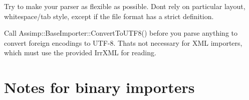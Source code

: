 \begin{DoxyItemize}
\item Try to make your parser as flexible as possible. Don\textquotesingle{}t rely on particular layout, whitespace/tab style, except if the file format has a strict definition. 
\item Call Assimp\+::\+Base\+Importer\+::\+Convert\+To\+U\+T\+F8() before you parse anything to convert foreign encodings to U\+T\+F-\/8. That\textquotesingle{}s not necessary for X\+M\+L importers, which must use the provided Irr\+X\+M\+L for reading.  
\end{DoxyItemize}\hypertarget{extend_bnote}{}\section{Notes for binary importers}\label{extend_bnote}

